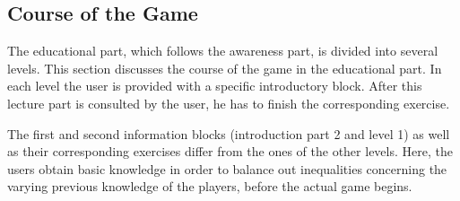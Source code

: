 \subsection{Course of the Game}
\label{s:game_rules}
The educational part, which follows the awareness part, is divided into several levels.
This section discusses the course of the game in the educational part.
 In each level the user is provided with a specific introductory block.
 After this lecture part is consulted by the user, he has to finish the corresponding exercise.

The first and second information blocks (introduction part 2 and level 1) as well as their corresponding exercises differ from the ones of the other levels. Here, the users obtain basic knowledge in order to balance out inequalities concerning the varying previous knowledge of the players, before the actual game begins.

